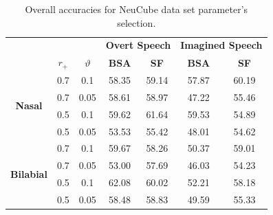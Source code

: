 \begin{table}[h!]
	\centering
	\caption{Overall accuracies for NeuCube data set parameter's selection.}
	\begin{tabular}{|*{7}{c|}}
		\cline{4-7}
		\multicolumn{3}{c|}{\multirow{1}{*}{}} & \multicolumn{2}{c|}{\textbf{Overt Speech}} & \multicolumn{2}{c|}{\textbf{Imagined Speech}} \\\cline{2-7}
		\multicolumn{1}{c|}{\multirow{1}{*}{}}  & \boldmath$r_{+}$ & \boldmath$\vartheta$ & \textbf{BSA} & \textbf{SF} & \textbf{BSA} & \textbf{SF} \\\hline
		\multirow{4}{*}{\begin{sideways}\textbf{Nasal}\end{sideways}} & \cellcolor{orange}0.7   & \cellcolor{orange}0.1   & 58.35 & 59.14 & 57.87 & \cellcolor{orange}60.19 \\\cline{2-7}
		& 0.7   & 0.05  & 58.61 & 58.97 & 47.22 & 55.46 \\\cline{2-7}
		& \cellcolor{orange}0.5   & \cellcolor{orange}0.1   & \cellcolor{orange}59.62 & \cellcolor{orange}61.64 & \cellcolor{orange}59.53 & 54.89 \\\cline{2-7}
		& 0.5   & 0.05  & 53.53 & 55.42 & 48.01 & 54.62 \\\hline
		\multirow{4}{*}{\begin{sideways}\textbf{Bilabial}\end{sideways}} & \cellcolor{orange}0.7   & \cellcolor{orange}0.1   & 59.67 & 58.26 & 50.37 & \cellcolor{orange}59.01 \\\cline{2-7}
		& 0.7   & 0.05  & 53.00 & 57.69 & 46.03 & 54.23 \\\cline{2-7}
		& \cellcolor{orange}0.5   & \cellcolor{orange}0.1   & \cellcolor{orange}62.08 & \cellcolor{orange}60.02 & \cellcolor{orange}52.21 & 58.18 \\\cline{2-7}
		& 0.5   & 0.05  & 58.48 & 58.83 & 49.59 & 55.33 \\\hline
	\end{tabular}%
	\label{Table: NeuCube_Dataset_Params}%
\end{table}%

